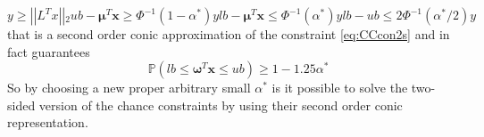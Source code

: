  \begin{subequations}
 	\begin{equation}
 	y \geq \left| \left| L^Tx  \right| \right| {}_2
 	\end{equation}
 	\begin{equation}
 	ub-\boldsymbol{\mu}^{T} \boldsymbol{x} \geq \Phi^{-1}(1-\alpha^*)y
 	\end{equation}
 	\begin{equation}
 	lb-\boldsymbol{\mu}^{T} \boldsymbol{x} \leq \Phi^{-1}(\alpha^*)y
 	\end{equation}
 	\begin{equation}
 	lb-ub \leq 2 \Phi^{-1}(\alpha^*/2)y
 	\end{equation}
 	\label{eq:CCeq2s}
 \end{subequations}
   that is a second order conic approximation of the constraint \eqref{eq:CCcon2s} and in fact guarantees 
   \begin{equation}
   \quad \mathbb{P}(lb \leq \boldsymbol{\omega}^{T}\boldsymbol{x} \leq ub)\geq 1-1.25\alpha^* 
   \end{equation}
   So by choosing a new proper arbitrary small $\alpha^*$ is it possible to solve the two-sided version of the chance constraints by using their second order conic representation.
 
%	
